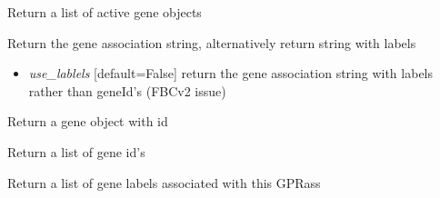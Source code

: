 \documentclass[a4paper,11pt,english]{sphinxmanual}
\begin{document}
\begin{fulllineitems}
\begin{fulllineitems}
\end{fulllineitems}


\begin{fulllineitems}
\label{modules_doc:cbmpy.CBModel.GeneProteinAssociation.getActiveGenes}
Return a list of active gene objects

\end{fulllineitems}


\begin{fulllineitems}
\label{modules_doc:cbmpy.CBModel.GeneProteinAssociation.getAssociationStr}
Return the gene association string, alternatively return string with labels
\begin{itemize}
\item {} 
\emph{use\_lablels} {[}default=False{]} return the gene association string with labels rather than geneId's (FBCv2 issue)

\end{itemize}

\end{fulllineitems}


\begin{fulllineitems}
\label{modules_doc:cbmpy.CBModel.GeneProteinAssociation.getGene}
Return a gene object with id

\end{fulllineitems}


\begin{fulllineitems}
\label{modules_doc:cbmpy.CBModel.GeneProteinAssociation.getGeneIds}
Return a list of gene id's

\end{fulllineitems}


\begin{fulllineitems}
\label{modules_doc:cbmpy.CBModel.GeneProteinAssociation.getGeneLabels}
Return a list of gene labels associated with this GPRass


\end{fulllineitems}
\end{fulllineitems}
\end{document}
